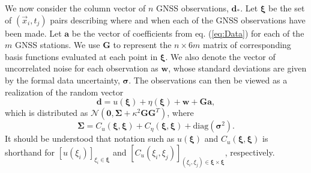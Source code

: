 \documentclass[10pt,letter]{article}
\begin{document}
We now consider the column vector of $n$ GNSS observations, $\bm{d}_*$. Let $\bm{\xi}$ be the set of $(\vec{x}_i, t_j)$ pairs describing where and when each of the GNSS observations have been made. Let $\bm{a}$ be the vector of coefficients from eq. (\ref{eq:Data}) for each of the $m$ GNSS stations. We use $\bm{G}$ to represent the $n \times 6m$ matrix of corresponding basis functions evaluated at each point in $\bm{\xi}$. We  also denote the vector of uncorrelated noise for each observation as $\bm{w}$, whose standard deviations are given by the formal data uncertainty, $\bm{\sigma}$. The observations can then be viewed as a realization of the random vector
\begin{equation}
\bm{d} = u(\bm{\xi}) + \eta(\bm{\xi}) + \bm{w} + \bm{G}\bm{a},
\end{equation}
which is distributed as $\mathcal{N}(\bm{0},\bm{\Sigma} + \kappa^2\bm{G}\bm{G}^T)$, where
\begin{equation}\label{eq:Cd}
\bm{\Sigma} = C_u(\bm{\xi},\bm{\xi}) + C_\eta(\bm{\xi},\bm{\xi}) + 
              \mathrm{diag}\left(\bm{\sigma}^2\right).  
\end{equation}
It should be understood that notation such as $u(\bm{\xi})$ and $C_u(\bm{\xi},\bm{\xi})$ is shorthand for $[u(\xi_i)]_{\xi_i \in \bm{\xi}}$ and $[C_u(\xi_i,\xi_j)]_{(\xi_i,\xi_j) \in \bm{\xi} \times \bm{\xi}}$, respectively. 
\end{document}
